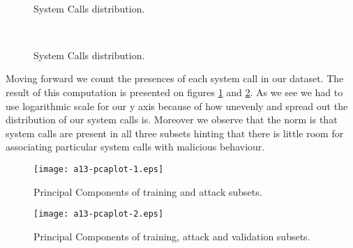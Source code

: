 \documentclass[reqno,openany,12pt]{amsbook}
\begin{document}
\begin{figure}
 \    
\caption{System Calls distribution.}
\label{syscalls1}
\end{figure}
\begin{figure}
 \    
\caption{System Calls distribution.}
\label{syscalls2}
\end{figure}

Moving forward we count the presences of each system call in our dataset. The result of this computation is presented on figures \ref{syscalls1} and \ref{syscalls2}. As we see we had to use logarithmic scale for our y axis because of how unevenly and spread out the distribution of our system calls is. Moreover we observe that the norm is that system calls are present in all three subsets hinting that there is little room for associating particular system calls with malicious behaviour.

\begin{figure}
\texttt{[image: a13-pcaplot-1.eps]}
\caption{Principal Components of training and attack subsets.}
\label{pca1}
\end{figure}
\begin{figure}
\texttt{[image: a13-pcaplot-2.eps]}
\caption{Principal Components of training, attack and validation subsets.}
\label{pca2}
\end{figure}
\end{document}
